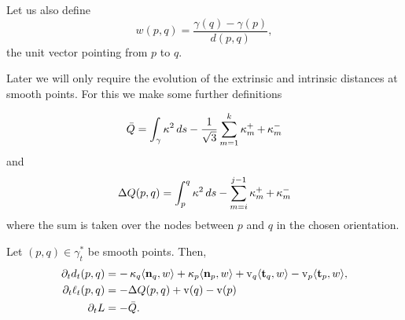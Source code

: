 \documentclass[12pt]{amsart}
\begin{document}
Let us also define
\begin{equation}
\label{eq:w}
w(p, q) = \frac{\gamma(q) - \gamma(p)}{d(p,q)},
\end{equation}
the unit vector pointing from \(p\) to \(q\).

Later we will only require the evolution of the extrinsic and intrinsic distances at smooth points. For this we make some further definitions

\begin{equation}
\label{eq:Q}
\bar{Q} = \int_{\gamma} \operatorname{\kappa}^2 ds - \frac{1}{\sqrt{3}} \sum_{m=1}^{k} \operatorname{\kappa}_m^+ + \operatorname{\kappa}_m^-
\end{equation}
and
\begin{equation}
\label{eq:delQ}
\Delta Q(p, q) = \int_p^q \operatorname{\kappa}^2 ds - \sum_{m=i}^{j-1} \operatorname{\kappa}_m^+ + \operatorname{\kappa}_m^-
\end{equation}
where the sum is taken over the nodes between \(p\) and \(q\) in the chosen orientation.

\begin{lemma}
\label{lem:distance_evolution}

Let \((p,q) \in \gamma_t^{\ast}\) be smooth points. Then,
\begin{align*}
\partial_t d_t(p, q) &= -\operatorname{\kappa}_q \langle{\operatorname{\mathbf{n}}_q},{w}\rangle + \operatorname{\kappa}_p \langle{\operatorname{\mathbf{n}}_p},{w}\rangle + \operatorname{v}_q \langle{\operatorname{\mathbf{t}}_q},{w}\rangle - \operatorname{v}_p \langle{\operatorname{\mathbf{t}}_p},{w}\rangle, \\
\partial_t \ell_t(p, q) &= -\Delta Q (p, q) + \operatorname{v}(q) - \operatorname{v}(p) \\
\partial_t L &= -\bar{Q}.
\end{align*}
\end{lemma}
\end{document}
